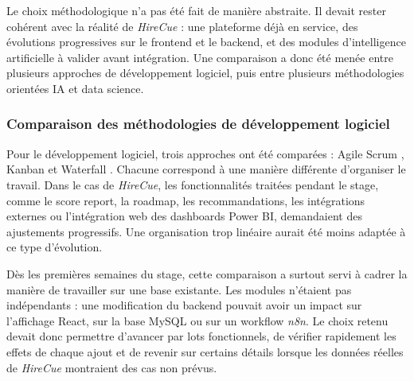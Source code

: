 Le choix méthodologique n'a pas été fait de manière abstraite. Il devait rester cohérent avec la réalité de \textit{HireCue} : une plateforme déjà en service, des évolutions progressives sur le frontend et le backend, et des modules d'intelligence artificielle à valider avant intégration. Une comparaison a donc été menée entre plusieurs approches de développement logiciel, puis entre plusieurs méthodologies orientées IA et data science.

\subsubsection{Comparaison des méthodologies de développement logiciel}

Pour le développement logiciel, trois approches ont été comparées : Agile Scrum \cite{scrumguide}, Kanban \cite{anderson_kanban} et Waterfall \cite{royce_waterfall}. Chacune correspond à une manière différente d'organiser le travail. Dans le cas de \textit{HireCue}, les fonctionnalités traitées pendant le stage, comme le score report, la roadmap, les recommandations, les intégrations externes ou l'intégration web des dashboards Power BI, demandaient des ajustements progressifs. Une organisation trop linéaire aurait été moins adaptée à ce type d'évolution.

Dès les premières semaines du stage, cette comparaison a surtout servi à cadrer la manière de travailler sur une base existante. Les modules n'étaient pas indépendants : une modification du backend pouvait avoir un impact sur l'affichage React, sur la base MySQL ou sur un workflow \textit{n8n}. Le choix retenu devait donc permettre d'avancer par lots fonctionnels, de vérifier rapidement les effets de chaque ajout et de revenir sur certains détails lorsque les données réelles de \textit{HireCue} montraient des cas non prévus.

